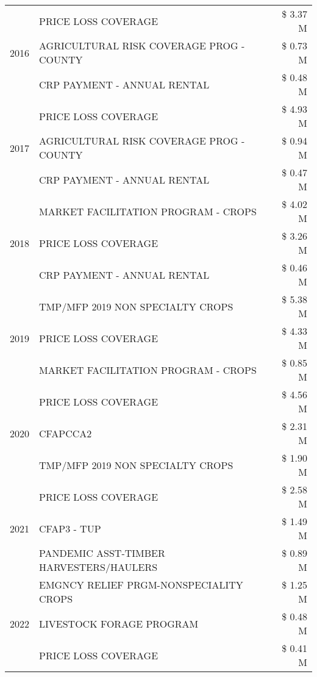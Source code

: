 \begin{tabular}{llr}
\cline{1-3}
\multirow[t]{3}{*}{2016} & PRICE LOSS COVERAGE & \$ 3.37 M \\
 & AGRICULTURAL RISK COVERAGE PROG - COUNTY & \$ 0.73 M \\
 & CRP PAYMENT - ANNUAL RENTAL & \$ 0.48 M \\
\cline{1-3}
\multirow[t]{3}{*}{2017} & PRICE LOSS COVERAGE & \$ 4.93 M \\
 & AGRICULTURAL RISK COVERAGE PROG - COUNTY & \$ 0.94 M \\
 & CRP PAYMENT - ANNUAL RENTAL & \$ 0.47 M \\
\cline{1-3}
\multirow[t]{3}{*}{2018} & MARKET FACILITATION PROGRAM - CROPS & \$ 4.02 M \\
 & PRICE LOSS COVERAGE & \$ 3.26 M \\
 & CRP PAYMENT - ANNUAL RENTAL & \$ 0.46 M \\
\cline{1-3}
\multirow[t]{3}{*}{2019} & TMP/MFP 2019 NON SPECIALTY CROPS & \$ 5.38 M \\
 & PRICE LOSS COVERAGE & \$ 4.33 M \\
 & MARKET FACILITATION PROGRAM - CROPS & \$ 0.85 M \\
\cline{1-3}
\multirow[t]{3}{*}{2020} & PRICE LOSS COVERAGE & \$ 4.56 M \\
 & CFAPCCA2 & \$ 2.31 M \\
 & TMP/MFP 2019 NON SPECIALTY CROPS & \$ 1.90 M \\
\cline{1-3}
\multirow[t]{3}{*}{2021} & PRICE LOSS COVERAGE & \$ 2.58 M \\
 & CFAP3 - TUP & \$ 1.49 M \\
 & PANDEMIC ASST-TIMBER HARVESTERS/HAULERS & \$ 0.89 M \\
\cline{1-3}
\multirow[t]{3}{*}{2022} & EMGNCY RELIEF PRGM-NONSPECIALITY CROPS & \$ 1.25 M \\
 & LIVESTOCK FORAGE PROGRAM & \$ 0.48 M \\
 & PRICE LOSS COVERAGE & \$ 0.41 M \\
\cline{1-3}
\bottomrule
\end{tabular}

